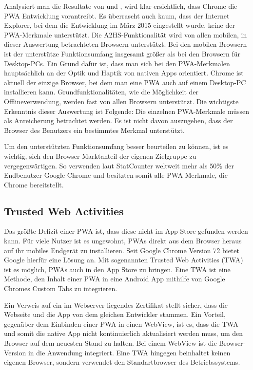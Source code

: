 Analysiert man die Resultate von  und
, wird klar ersichtlich, dass Chrome
die PWA Entwicklung vorantreibt. Es überrascht auch kaum, dass der Internet Explorer,
bei dem die Entwicklung im März 2015 eingestellt wurde, \cite{HeiseInternetExplorer} keine der PWA-Merkmale
unterstützt. Die A2HS-Funktionalität wird von allen
mobilen, in dieser Auswertung betrachteten Browsern unterstützt.
Bei den mobilen Browsern ist der unterstütze Funktionsumfang insgesamt größer als
bei den Browsern für Desktop-PCs. Ein Grund dafür ist, dass man sich bei den PWA-Merkmalen
hauptsächlich an der Optik und Haptik von nativen Apps orientiert. Chrome ist aktuell
der einzige Browser, bei dem man eine PWA auch auf einem Desktop-PC installieren
kann. Grundfunktionalitäten, wie  die Möglichkeit der Offlineverwendung, werden fast von allen
Browsern unterstützt. Die wichtigste Erkenntnis dieser Auswertung ist Folgende: Die einzelnen
PWA-Merkmale müssen als Anreicherung betrachtet werden. Es ist nicht davon auszugehen, dass
der Browser des Benutzers ein bestimmtes Merkmal unterstützt.

Um den unterstützten Funktionsumfang besser beurteilen zu können, ist es wichtig,
sich den Browser-Marktanteil der eigenen Zielgruppe zu vergegenwärtigen.
So verwenden laut StatCounter weltweit mehr als 50\% der Endbenutzer Google Chrome und besitzten somit
alle PWA-Merkmale, die Chrome bereitstellt.\cite{StatCounterBrowserMarketShare}

\subsection{Trusted Web Activities}
\label{subsec:trustedwebactivities}
Das größte Defizit einer PWA ist, dass diese nicht im App Store gefunden werden kann.
Für viele Nutzer ist es ungewohnt, PWAs direkt aus dem Browser heraus auf ihr mobiles Endgerät zu installieren.
Seit Google Chrome Version 72 bietet Google hierfür eine Lösung an.
Mit sogenannten Trusted Web Activities (TWA) ist es möglich, PWAs auch in den App Store
zu bringen. Eine TWA ist eine Methode, den Inhalt einer PWA in eine Android App mithilfe
von Google Chromes Custom Tabs zu integrieren.\cite{TrustedWebActivitiesGoogle}

Ein Verweis auf ein im Webserver liegendes Zertifikat stellt sicher,
dass die Webseite und die App von dem gleichen Entwickler
stammen. Ein Vorteil, gegenüber dem Einbinden einer PWA in einen WebView, ist es,
dass die TWA und somit die native App nicht kontinuierlich aktualisiert werden muss,
um den Browser auf dem neuesten Stand zu halten. Bei einem WebView ist die Browser-Version in
die Anwendung integriert. Eine TWA hingegen beinhaltet keinen eigenen Browser, sondern verwendet
den Standartbrowser des Betriebssystems.


